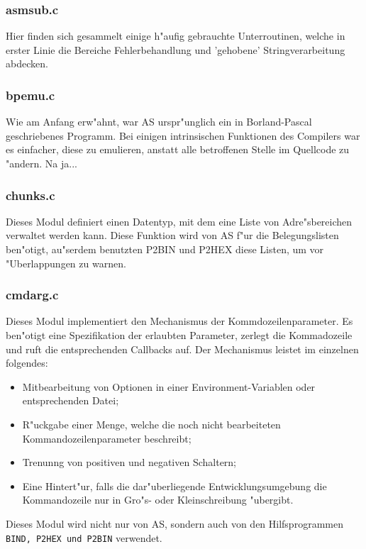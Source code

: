 \documentclass[12pt,a4paper,twoside]{report}
\newcommand{\tty}[1]{{\tt #1}}
\begin{document}
\subsubsection{asmsub.c}

Hier finden sich gesammelt einige h"aufig gebrauchte Unterroutinen, welche
in erster Linie die Bereiche Fehlerbehandlung und 'gehobene'
Stringverarbeitung abdecken.

\subsubsection{bpemu.c}

Wie am Anfang erw"ahnt, war AS urspr"unglich ein in Borland-Pascal
geschriebenes Programm.  Bei einigen intrinsischen Funktionen des
Compilers war es einfacher, diese zu emulieren, anstatt alle betroffenen
Stelle im Quellcode zu "andern. Na ja...

\subsubsection{chunks.c}

Dieses Modul definiert einen Datentyp, mit dem eine Liste von
Adre"sbereichen verwaltet werden kann.  Diese Funktion wird von AS
f"ur die Belegungslisten ben"otigt, au"serdem benutzten P2BIN und
P2HEX diese Listen, um vor "Uberlappungen zu warnen.

\subsubsection{cmdarg.c}

Dieses Modul implementiert den Mechanismus der Kommdozeilenparameter.  Es
ben"otigt eine Spezifikation der erlaubten Parameter, zerlegt die
Kommadozeile und ruft die entsprechenden Callbacks auf.  Der Mechanismus
leistet im einzelnen folgendes:
\begin{itemize}
\item{Mitbearbeitung von Optionen in einer Environment-Variablen oder
      entsprechenden Datei;}
\item{R"uckgabe einer Menge, welche die noch nicht bearbeiteten
      Kommandozeilenparameter beschreibt;}
\item{Trenunng von positiven und negativen Schaltern;}
\item{Eine Hintert"ur, falls die dar"uberliegende Entwicklungsumgebung die
      Kommandozeile nur in Gro"s- oder Kleinschreibung "ubergibt.}
\end{itemize}
Dieses Modul wird nicht nur von AS, sondern auch von den Hilfsprogrammen
\tty{BIND, P2HEX und P2BIN} verwendet.
\end{document}

